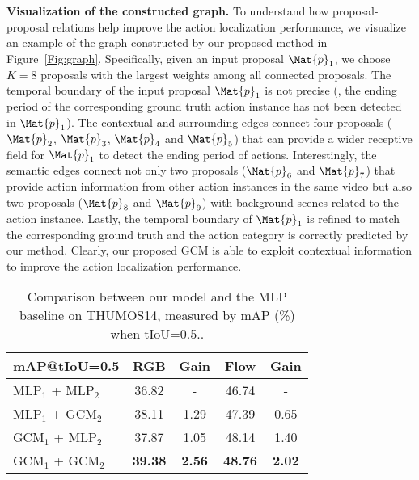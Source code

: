 \documentclass[10pt,journal,compsoc]{IEEEtran}
\begin{document}
	\noindent \textbf{Visualization of the constructed graph.} To understand how proposal-proposal relations help improve the action localization performance, we visualize an example of the graph constructed by our proposed method in Figure~\ref{Fig:graph}. Specifically, given an input proposal $\Mat{p}_1$, we choose $K=8$ proposals with the largest weights among all connected proposals. The temporal boundary of the input proposal $\Mat{p}_1$ is not precise (\ie, the ending period of the corresponding ground truth action instance has not been detected in $\Mat{p}_1$). The contextual and surrounding edges connect four proposals ($\Mat{p}_2$, $\Mat{p}_3$, $\Mat{p}_4$ and $\Mat{p}_5$) that can provide a wider receptive field for $\Mat{p}_1$ to detect the ending period of actions. Interestingly, the semantic edges connect not only two proposals ($\Mat{p}_6$ and $\Mat{p}_7$) that provide action information from other action instances in the same video but also two proposals ($\Mat{p}_8$ and $\Mat{p}_9$) with background scenes related to the action instance. Lastly, the temporal boundary of $\Mat{p}_1$ is refined to match the corresponding ground truth and the action category is correctly predicted by our method. Clearly, our proposed GCM is able to exploit contextual information to improve the action localization performance.
	
			\begin{table}[!tb]
	\centering
	\caption{Comparison between our model and the MLP baseline on THUMOS14, measured by mAP (\%) when tIoU=0.5..}
	\begin{tabular}{l|cc|cc}
		\hline
		mAP@tIoU=0.5                & RGB     & Gain      & Flow     & Gain        \\ \hline
		MLP$_1$ + MLP$_2$        & 36.82      & -       & 46.74  & -\\
		MLP$_1$ + GCM$_2$  & 38.11   & 1.29       & 47.39 & 0.65\\
		GCM$_1$ + MLP$_2$  & 37.87   &  1.05       & 48.14  & 1.40 \\
		GCM$_1$ + GCM$_2$   & \textbf{39.38}   & \textbf{2.56}       & \textbf{48.76}  &  \textbf{2.02}\\ \hline
	\end{tabular}
	\label{Tab:twographs}
\end{table} 
\end{document}
